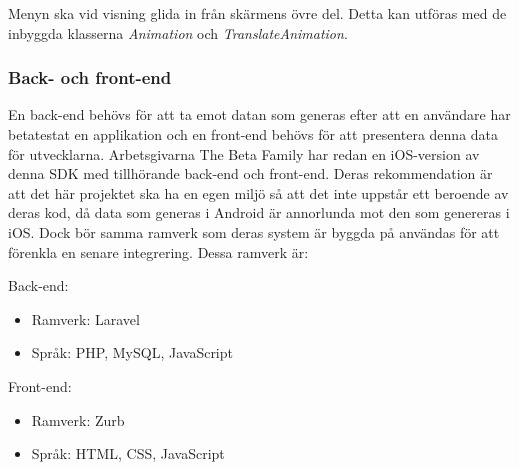 Menyn ska vid visning glida in från skärmens övre del. Detta kan utföras med de inbyggda klasserna \textit{Animation} och \textit{TranslateAnimation}.

\subsubsection{Back- och front-end}
\label{subsubsec:backfront}
En back-end behövs för att ta emot datan som generas efter att en användare har betatestat en applikation och en front-end behövs för att presentera denna data för utvecklarna. Arbetsgivarna The Beta Family har redan en iOS-version av denna SDK med tillhörande back-end och front-end. Deras rekommendation är att det här projektet ska ha en egen miljö så att det inte uppstår ett beroende av deras kod, då data som generas i Android är annorlunda mot den som genereras i iOS. Dock bör samma ramverk som deras system är byggda på användas för att förenkla en senare integrering. Dessa ramverk är:

Back-end:
\begin{itemize}
	\item Ramverk: Laravel
	\item Språk: PHP, MySQL, JavaScript
\end{itemize}

Front-end:
\begin{itemize}
	\item Ramverk: Zurb
	\item Språk: HTML, CSS, JavaScript
\end{itemize}
